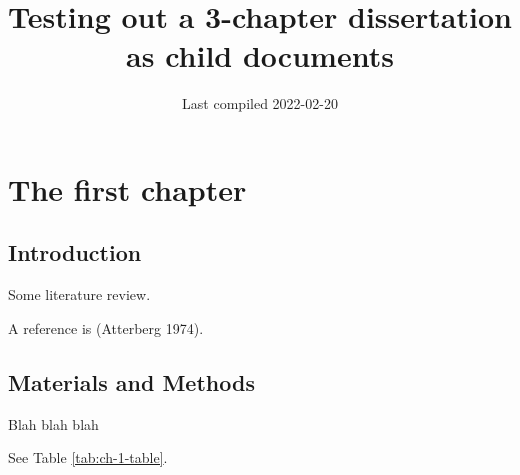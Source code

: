 \documentclass[
]{article}
\title{Testing out a 3-chapter dissertation as child documents}
\author{}
\date{\vspace{-2.5em}Last compiled 2022-02-20}
\begin{document}
\maketitle

{
\setcounter{tocdepth}{2}
\tableofcontents
}
\hypertarget{the-first-chapter}{%
\section{The first chapter}\label{the-first-chapter}}

\hypertarget{introduction}{%
\subsection{Introduction}\label{introduction}}

Some literature review.

A reference is (Atterberg 1974).

\hypertarget{materials-and-methods}{%
\subsection{Materials and Methods}\label{materials-and-methods}}

Blah blah blah

See Table \ref{tab:ch-1-table}.
\end{document}
